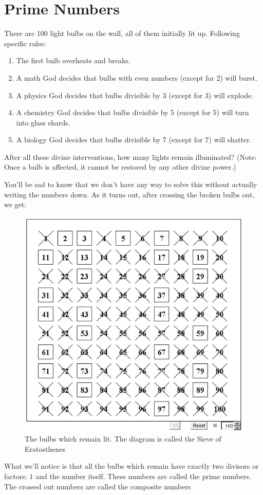 \section{Prime Numbers}
\begin{example}
    There are 100 light bulbs on the wall, all of them initially lit up. Following specific rules:
    \begin{enumerate}
        \item The first bulb overheats and breaks.
        \item A math God decides that bulbs with even numbers (except for 2) will burst.
        \item A physics God decides that bulbs divisible by 3 (except for 3) will explode.
        \item A chemistry God decides that bulbs divisible by 5 (except for 5) will turn into glass shards.
        \item A biology God decides that bulbs divisible by 7 (except for 7) will shatter.
    \end{enumerate}
After all these divine interventions, how many lights remain illuminated? (Note: Once a bulb is affected, it cannot be restored by any other divine power.)
\end{example}
You'll be sad to know that we don't have any way to solve this without actually writing the numbers down. As it turns out, after crossing the broken bulbs out, we get:\\
\begin{figure}[h]
    \centering
    \includegraphics[width=0.5\linewidth]{Photos/Prime Sieve.png}
    \caption{The bulbs which remain lit. The diagram is called the Sieve of Eratosthenes}
\end{figure}
What we'll notice is that all the bulbs which remain have exactly two divisors or factors: $1$ and the
number itself. These numbers are called the prime numbers. The crossed out numbers are called the composite numbers\\
